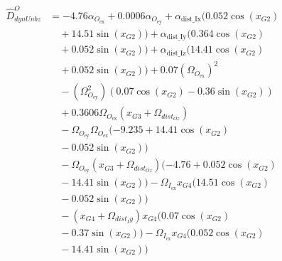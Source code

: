 \documentclass[letterpaper, 10 pt, conference]{ieeeconf}  %
\begin{document}
\begin{equation}
  \begin{aligned}
    \hat{D}^O_{dynUnbz} & = -4.76\alpha_{O_{\text{ex}}} + 0.0006\alpha_{O_{\text{ey}}} + \alpha_{\text{dist\_Ix}}(0.052\cos(x_{G2}) \\
                        & \quad + 14.51\sin(x_{G2})) + \alpha_{\text{dist\_Iy}}(0.364\cos(x_{G2})                                   \\
                        & \quad + 0.052\sin(x_{G2})) + \alpha_{\text{dist\_Iz}}(14.41\cos(x_{G2})                                   \\
                        & \quad + 0.052\sin(x_{G2}))  + 0.07(\Omega_{O_{\text{ex}}})^2                                              \\
                        & \quad - (\Omega_{O_{\text{ey}}}^2)(0.07\cos(x_{G2}) - 0.36\sin(x_{G2}))                                   \\
                        & \quad + 0.3606\Omega_{O_{\text{ex}}}(x_{G3} + \Omega_{dist_{Oz}})                                         \\
                        & \quad - \Omega_{O_{\text{ey}}}\Omega_{O_{\text{ex}}}(-9.235 + 14.41\cos(x_{G2})                           \\
                        & \quad - 0.052\sin(x_{G2}))                                                                                \\
                        & \quad - \Omega_{O_{\text{ey}}}(x_{G3} + \Omega_{dist_{Oz}})(-4.76 + 0.052\cos(x_{G2})                     \\
                        & \quad - 14.41\sin(x_{G2})) - \Omega_{I_{\text{ex}}}x_{G4}(14.51\cos(x_{G2})                               \\
                        & \quad - 0.052\sin(x_{G2}))                                                                                \\
                        & \quad - (x_{G4} + \Omega_{dist{_Iy}})x_{G4}(0.07\cos(x_{G2})                                              \\
                        & \quad - 0.37\sin(x_{G2})) - \Omega_{I_{\text{ez}}}x_{G4}(0.052\cos(x_{G2})                                \\
                        & \quad - 14.41\sin(x_{G2}))
  \end{aligned}
\end{equation}
\end{document}
